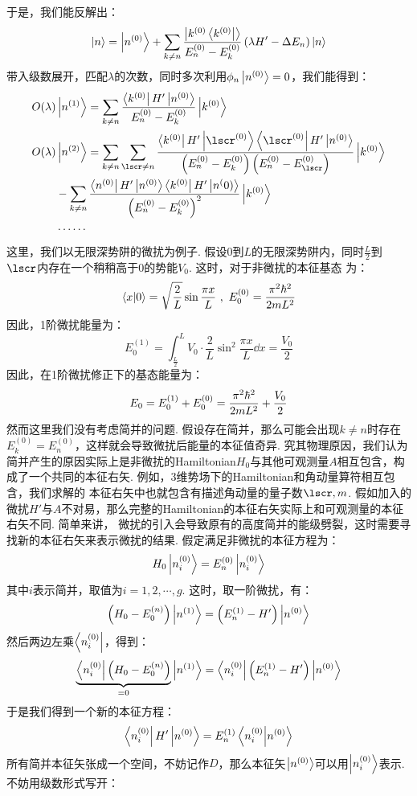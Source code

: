 于是，我们能反解出：
\[
\ket{n} = \ket{n^{(0)}} + \sum_{k\neq n}\frac{\ket{k^{(0)}\bra{k^{(0)}}}}{E_{n}^{(0)}-E_{k}^{(0)}}\left({\lambda H' - \Delta E_{n}}\right)\ket{n} 
\]
带入级数展开，匹配\(\lambda\)的次数，同时多次利用\(\phi_{n}\ket{n^{(0)}}=0\)，我们能得到：
\begin{align*}
O(\lambda) & \ket{n^{(1)}} = \sum_{k\neq n}\frac{\bra{k^{(0)}}H'\ket{n^{(0)}}}{E_{n}^{(0)}-E_{k}^{(0)}}\ket{k^{(0)}} \\
O(\lambda) & \ket{n^{(2)}} = \sum_{k\neq n}\sum_{\lscr\neq n}\frac{\bra{k^{(0)}}H'\ket{\lscr^{(0)}}\bra{\lscr^{(0)}}H'\ket{n^{(0)}}}{\br{E_{n}^{(0)}-E_{k}^{(0)}}\br{E_{n}^{(0)}-E_{\lscr}^{(0)}}}\ket{k^{(0)}} \\
& - \sum_{k\neq n} \frac{\bra{n^{(0)}}H'\ket{n^{(0)}}\bra{k^{(0)}}H'\ket{n^(0)}}{\br{E_{n}^{(0)}-E_{k}^{(0)}}^{2}}\ket{k^{(0)}} \\
& \cdots\cdots
\end{align*}
这里，我们以无限深势阱的微扰为例子. 假设\(0\)到\(L\)的无限深势阱内，同时\(\frac{L}{2}\)到\(\lscr\)内存在一个稍稍高于0的势能\(V_{0}\). 这时，对于非微扰的本征基态
为：
\[
\bra{x}\ket{0} = \sqrt{\frac{2}{L}}\sin\frac{\pi x}{L}\ , \ E_{0}^{(0)} = \frac{\pi^2\hbar^2}{2mL^2}
\]
因此，1阶微扰能量为：
\[
E_{0}^{(1)} = \int_{\frac{L}{2}}^{L}V_{0}\cdot\frac{2}{L}\sin^{2}\frac{\pi x}{L}\dd x = \frac{V_{0}}{2}
\]
因此，在1阶微扰修正下的基态能量为：
\[
E_{0} = E_{0}^{(1)} + E_{0}^{(0)} = \frac{\pi^2\hbar^2}{2mL^2} + \frac{V_{0}}{2}
\]
然而这里我们没有考虑简并的问题. 假设存在简并，那么可能会出现\(k\neq n\)时存在\(E_{k}^{(0)}=E_{n}^{(0)}\)，这样就会导致微扰后能量的本征值奇异. 究其物理原因，我们认为
简并产生的原因实际上是非微扰的Hamiltonian\(H_{0}\)与其他可观测量\(A\)相互包含，构成了一个共同的本征右矢. 例如，3维势场下的Hamiltonian和角动量算符相互包含，我们求解的
本征右矢中也就包含有描述角动量的量子数\(\lscr,m\). 假如加入的微扰\(H'\)与\(A\)不对易，那么完整的Hamiltonian的本征右矢实际上和可观测量的本征右矢不同. 简单来讲，
微扰的引入会导致原有的高度简并的能级劈裂，这时需要寻找新的本征右矢来表示微扰的结果. 假定满足非微扰的本征方程为：
\[
H_{0}\ket{n_{i}^{(0)}} = E_{n}^{(0)}\ket{n_{i}^{(0)}}
\]
其中\(i\)表示简并，取值为\(i=1,2,\cdots,g\). 这时，取一阶微扰，有：
\[
\left({H_{0} - E_{0}^{(n)}}\right)\ket{n^{(1)}} = \left({E_{n}^{(1)} - H'}\right)\ket{n^{(0)}}
\]
然后两边左乘\(\bra{n_{i}^{(0)}}\)，得到：
\[
\underbrace{\bra{n_{i}^{(0)}}\left({H_{0} - E_{0}^{(n)}}\right)}_{=0}\ket{n^{(1)}} = \bra{n_{i}^{(0)}}\left({E_{n}^{(1)} - H'}\right)\ket{n^{(0)}}
\]
于是我们得到一个新的本征方程：
\[
\bra{n_{i}^{(0)}}H'\ket{n^{(0)}} = E_{n}^{(1)}\bra{n_{i}^{(0)}}\ket{n^{(0)}}
\]
所有简并本征矢张成一个空间，不妨记作\(D\)，那么本征矢\(\ket{n^{(0)}}\)可以用\(\ket{n_{i}^{(0)}}\)表示. 不妨用级数形式写开：

